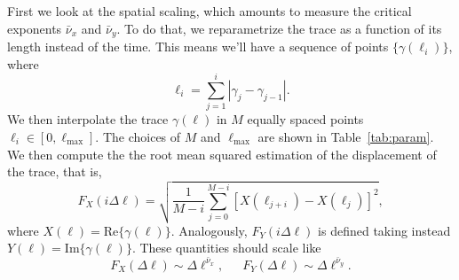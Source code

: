 First we look at the spatial scaling, which amounts to measure the critical
exponents $\bar{\nu}_x$ and $\bar{\nu}_y$. To do that, we reparametrize the
trace as a function of its length instead of the time. This means we'll have
a sequence of points $\{\gamma(\ell_i)\}$, where
\begin{equation}
    \ell_i = \sum_{j=1}^i \left|\gamma_j-\gamma_{j-1}\right|.
\end{equation}
We then interpolate the trace $\gamma(\ell)$ in $M$ equally spaced points
$\ell_i\in[0,\ell_{\max}]$. The choices of $M$ and $\ell_{\max}$ are shown in
Table~\ref{tab:param}. We then compute the the root mean squared estimation of
the displacement of the trace, that is,
\begin{equation}
    \label{eq:correl}
    F_X(i\Delta\ell) = \sqrt{\frac{1}{M-i}
    \sum_{j=0}^{M-i}{[X(\ell_{j+i}) - X(\ell_j)]}^2 },
\end{equation}
where $X(\ell) = \mbox{Re}\{\gamma(\ell)\}$.
Analogously, $F_Y(i\Delta\ell)$ is defined taking instead
$Y(\ell)=\mbox{Im}\{\gamma(\ell)\}$. These quantities should scale like
\begin{equation}
    F_{X}\left(\Delta\ell\right)\sim\Delta\ell^{\bar{\nu}_{x}},
    \,\,\,\,\,\,\,\,\,
    F_{Y}\left(\Delta\ell\right)\sim\Delta\ell^{\bar{\nu}_{y}}.
\end{equation}

